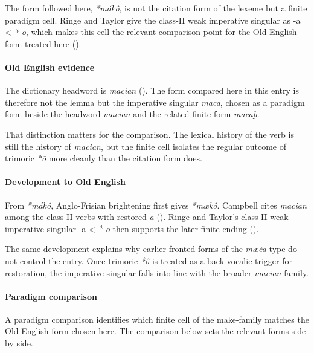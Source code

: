 \documentclass[
  british,
  a4paper,
]{article}
\begin{document}
The form followed here, \emph{*mákô}, is not the citation form of the
lexeme but a finite paradigm cell. Ringe and Taylor give the class-II
weak imperative singular as -a \textless{} \emph{*-ō}, which makes this
cell the relevant comparison point for the Old English form treated here
().

\paragraph{Old English evidence}\label{old-english-evidence-57}

The dictionary headword is \emph{macian}
(). The form compared
here in this entry is therefore not the lemma but the imperative
singular \emph{maca}, chosen as a paradigm form beside the headword
\emph{macian} and the related finite form \emph{macaþ}.

That distinction matters for the comparison. The lexical history of the
verb is still the history of \emph{macian}, but the finite cell isolates
the regular outcome of trimoric \emph{*ō} more cleanly than the citation
form does.

\paragraph{Development to Old
English}\label{development-to-old-english-57}

From \emph{*mákô}, Anglo-Frisian brightening first gives \emph{*mækô}.
Campbell cites \emph{macian} among the class-II verbs with restored
\emph{a} (). Ringe
and Taylor's class-II weak imperative singular -a \textless{} \emph{*-ō}
then supports the later finite ending
().

The same development explains why earlier fronted forms of the
\emph{mæċa} type do not control the entry. Once trimoric \emph{*ô} is
treated as a back-vocalic trigger for restoration, the imperative
singular falls into line with the broader \emph{macian} family.

\paragraph{Paradigm comparison}\label{paradigm-comparison-18}

A paradigm comparison identifies which finite cell of the make-family
matches the Old English form chosen here. The comparison below sets the
relevant forms side by side.
\end{document}
